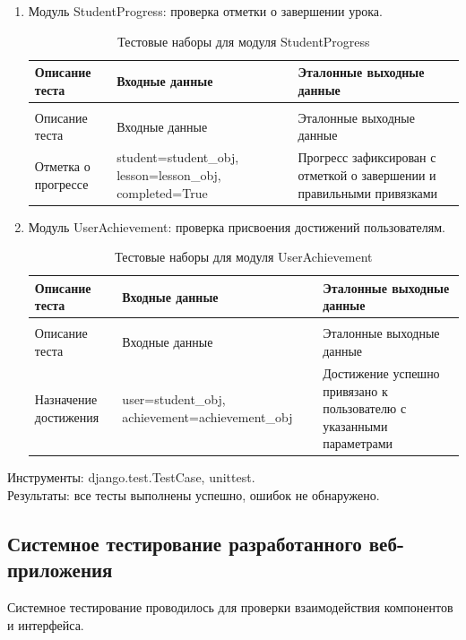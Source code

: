 \begin{enumerate}
	\item Модуль StudentProgress: проверка отметки о завершении урока.
	\begin{xltabular}{\textwidth}{|p{3cm}|p{6cm}|p{6cm}|}
		\caption{Тестовые наборы для модуля StudentProgress\label{tab:studentprogress_tests}}\\
		\hline
		Описание теста & Входные данные & Эталонные выходные данные \\ \hline
		\endfirsthead
		\\
		\hline
		Описание теста & Входные данные & Эталонные выходные данные \\ \hline
		\endhead
		Отметка о прогрессе & student=student\_obj, lesson=lesson\_obj, completed=True & Прогресс зафиксирован с отметкой о завершении и правильными привязками \\ \hline
	\end{xltabular}
	
	\item Модуль UserAchievement: проверка присвоения достижений пользователям.
	\begin{xltabular}{\textwidth}{|p{3cm}|p{6cm}|p{6cm}|}
		\caption{Тестовые наборы для модуля UserAchievement\label{tab:userachievement_tests}}\\
		\hline
		Описание теста & Входные данные & Эталонные выходные данные \\ \hline
		\endfirsthead
		\\
		\hline
		Описание теста & Входные данные & Эталонные выходные данные \\ \hline
		\endhead
		Назначение достижения & user=student\_obj, achievement=achievement\_obj & Достижение успешно привязано к пользователю с указанными параметрами \\ \hline
	\end{xltabular}
\end{enumerate}


Инструменты: django.test.TestCase, unittest.\\
Результаты: все тесты выполнены успешно, ошибок не обнаружено.


\subsection{Системное тестирование разработанного веб-приложения}

Системное тестирование проводилось для проверки взаимодействия компонентов и интерфейса.

